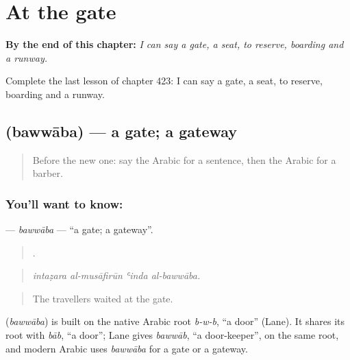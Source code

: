 
\chapter{At the gate}
\label{ch:ar-at-the-gate}

\begin{chapteropening}
\textbf{By the end of this chapter:} \emph{I can say a gate, a seat, to reserve, boarding and a runway.}

Complete the last lesson of chapter 423: I can say a gate, a seat, to reserve, boarding and a runway.
\end{chapteropening}

\section[\texorpdfstring{\ar{بوابة} (bawwāba)}{بوابة (bawwāba)}]{ (bawwāba) — a gate; a gateway}

\label{lesson:AR-C423-bawwaba}



\begin{quote}
Before the new one: say the Arabic for a sentence, then the Arabic for a barber.
\end{quote}

\subsection*{You'll want to know: }
\textbf{} — \emph{bawwāba} — \textquotedblleft{}a gate; a gateway\textquotedblright{}.

\begin{quote}
   .
\end{quote}

\begin{quote}
\emph{intaẓara al-musāfirūn ʿinda al-bawwāba.}
\end{quote}

\begin{quote}
The travellers waited at the gate.
\end{quote}

\begin{cousinweb}
\textbf{} (\emph{bawwāba}) is built on the native Arabic root \emph{b-w-b}, \textquotedblleft{}a door\textquotedblright{} (Lane). It shares its root with \emph{bāb}, \textquotedblleft{}a door\textquotedblright{}; Lane gives \emph{bawwāb}, \textquotedblleft{}a door-keeper\textquotedblright{}, on the same root, and modern Arabic uses \emph{bawwāba} for a gate or a gateway.
\end{cousinweb}

